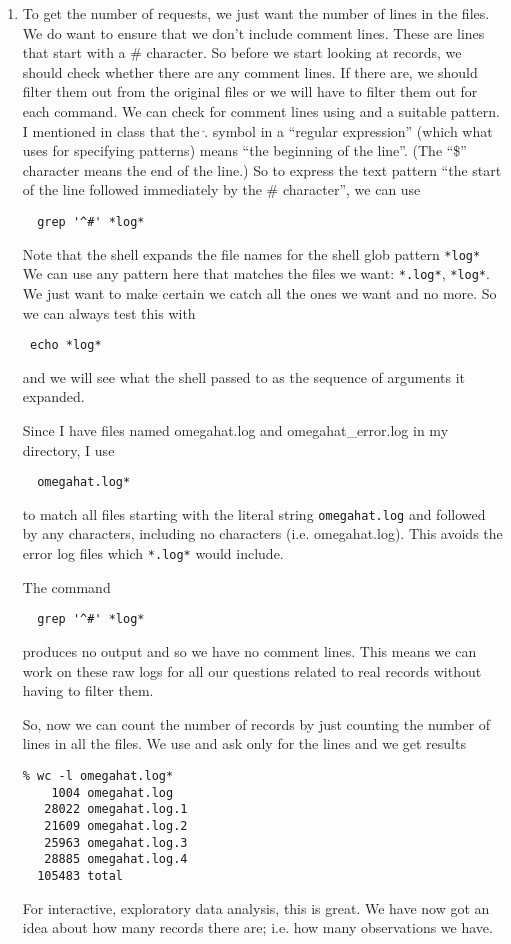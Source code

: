 \begin{enumerate}
\item 
To get the number of requests, we just want the number of lines in the
files. We do want to ensure that we don't include comment lines.
These are lines that start with a \# character.
So before we start looking at records, we should check whether there
are any comment lines. If there are, we should filter them out from
the original files or we will have to filter them out for each command.
We can check for comment lines  using 
 and a suitable pattern. 
I mentioned in class that the $\hat.$ symbol in a ``regular expression''
(which what  uses for specifying patterns)
means ``the beginning of the line''. (The ``\$'' character means the
end of the line.)
So to express the text pattern ``the start of the line followed
immediately by the \# character'', we can use
\begin{verbatim}
  grep '^#' *log*
\end{verbatim}
Note that the shell expands the file names for the shell glob
pattern \verb+*log*+
We can use any pattern here that matches the files we want:
\verb+*.log*+,  \verb+*log*+.
We just want to make certain we catch all the ones we want and
no more. So we can always test this with
\begin{verbatim}
 echo *log*
\end{verbatim}
and we will see what the shell passed to 
as the sequence of arguments it expanded.

Since I have files named omegahat.log and omegahat\_error.log
in my directory, I use
\begin{verbatim}
  omegahat.log*
\end{verbatim}
to match all files starting with the literal string
\verb+omegahat.log+ and followed by any characters, including
no characters (i.e. omegahat.log).
This avoids the error log files which \verb+*.log*+
would include.

The command
\begin{verbatim}
  grep '^#' *log*
\end{verbatim}
produces no output and so we have no comment lines. This means
we can work on these raw logs for all our questions related to
real records without having to filter them.

So, now we can count the number of records by just
counting the number of lines in all the files.
We use  and ask only for the lines
and we get results 
\begin{verbatim}
% wc -l omegahat.log*
    1004 omegahat.log
   28022 omegahat.log.1
   21609 omegahat.log.2
   25963 omegahat.log.3
   28885 omegahat.log.4
  105483 total
\end{verbatim}
For interactive, exploratory data analysis, this is great.
We  have now got an idea about how many records there are;
i.e. how many observations we have.


\end{enumerate}
